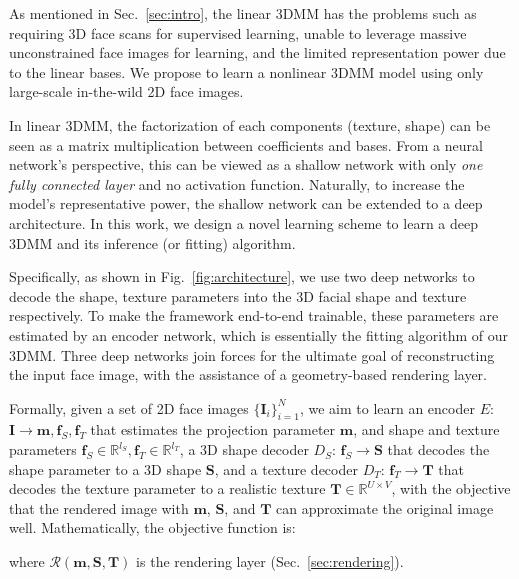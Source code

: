 
As mentioned in Sec.~\ref{sec:intro}, the linear 3DMM has the problems such as requiring 3D face scans for supervised learning, unable to leverage massive unconstrained face images for learning, and the limited representation power due to the linear bases.
We propose to learn a nonlinear 3DMM model using only large-scale in-the-wild 2D face images.


In linear 3DMM, the factorization of each components (texture, shape)  can be seen as a matrix multiplication between coefficients and bases. 
From a neural network's perspective, this can be viewed as a shallow network with only {\it one fully connected layer} and no activation function. 
Naturally, to increase the model's representative power, the shallow network can be extended to a deep architecture. 
In this work, we design a novel learning scheme to learn a deep 3DMM and its inference (or fitting) algorithm. 

Specifically, as shown in Fig.~\ref{fig:architecture}, we use two deep networks to decode the shape, texture parameters into the 3D facial shape and texture respectively. 
To make the framework end-to-end trainable, these parameters are estimated by an encoder network, which is essentially the fitting algorithm of our 3DMM.
Three deep networks join forces for the ultimate goal of reconstructing the input face image, with the assistance of a geometry-based rendering layer. 

Formally, given a set of 2D face images $\{\mathbf{I}_i \}_{i=1}^N$, we aim to learn an encoder $E$: $\mathbf{I}{\rightarrow}\mathbf{m},\mathbf{f}_S, \mathbf{f}_T$ that estimates the projection parameter $\mathbf{m}$, and shape and texture parameters $\mathbf{f}_S\in\mathbb{R}^{l_S}, \mathbf{f}_T\in\mathbb{R}^{l_T}$, a 3D shape decoder $D_S$: $\mathbf{f}_S{\rightarrow} \mathbf{S}$ that decodes the shape parameter to a 3D shape $\mathbf{S}$, and a texture decoder $D_T$: $\mathbf{f}_T{\rightarrow} \mathbf{T}$ that decodes the texture parameter to a realistic texture $\mathbf{T}\in\mathbb{R}^{U\times V}$, with the objective that the rendered image with $\mathbf{m}$, $\mathbf{S}$, and $\mathbf{T}$ can approximate the original image well. 
Mathematically, the objective function is:

\noindent {}
where $\mathcal{R}(\mathbf{m},\mathbf{S},\mathbf{T})$ is the rendering layer (Sec.~\ref{sec:rendering}).


